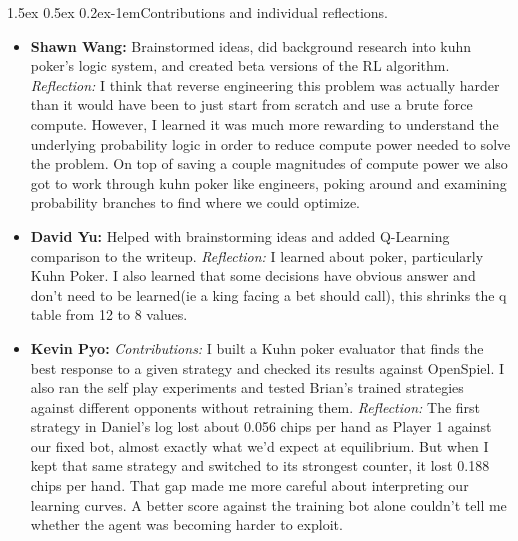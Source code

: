 \documentclass{article}
\makeatletter
\renewcommand{\paragraph}{\@startsection{paragraph}{4}{\z@}%
    {1.5ex \@plus 0.5ex \@minus 0.2ex}{-1em}{\normalsize\bf}}
\makeatother
\begin{document}
\paragraph{Contributions and individual reflections.}
\begin{itemize}\itemsep2pt
  \item \textbf{Shawn Wang:} Brainstormed ideas, did background research into kuhn poker's logic system, and created beta versions of the RL algorithm. \emph{Reflection:} I think that reverse engineering this problem was actually harder than it would have been to just start from scratch and use a brute force compute. However, I learned it was much more rewarding to understand the underlying probability logic in order to reduce compute power needed to solve the problem. On top of saving a couple magnitudes of compute power we also got to work through kuhn poker like engineers, poking around and examining probability branches to find where we could optimize.
  \item \textbf{David Yu:} Helped with brainstorming ideas and added Q-Learning comparison to the writeup. \emph{Reflection:} I learned about poker, particularly Kuhn Poker. I also learned that some decisions have obvious answer and don't need to be learned(ie a king facing a bet should call), this shrinks the q table from 12 to 8 values.
  \item \textbf{Kevin Pyo:} \emph{Contributions:} I built a Kuhn poker evaluator that finds the best response to a given strategy and checked its results against OpenSpiel. I also ran the self play experiments and tested Brian's trained strategies against different opponents without retraining them. \emph{Reflection:} The first strategy in Daniel's log lost about 0.056 chips per hand as Player 1 against our fixed bot, almost exactly what we'd expect at equilibrium. But when I kept that same strategy and switched to its strongest counter, it lost 0.188 chips per hand. That gap made me more careful about interpreting our learning curves. A better score against the training bot alone couldn't tell me whether the agent was becoming harder to exploit.


\end{itemize}
\end{document}
